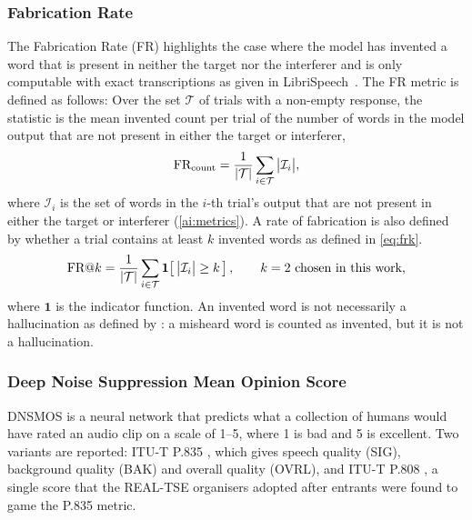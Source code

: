 \subsubsection{Fabrication Rate}
\label{sec:fr}
The Fabrication Rate (FR) highlights the case where the model has invented a word that is present in neither the target nor the interferer and is only computable with exact transcriptions as given in LibriSpeech~\cite{panayotov2015librispeech}. The FR metric is defined as follows:
Over the set $\mathcal{T}$ of trials with a non-empty response, the statistic is the mean invented count per trial of the number of words in the model output that are not present in either the target or interferer, 
\begin{equation}
    \textup{FR}_{\textup{count}} = \frac{1}{|\mathcal{T}|} \sum_{i \in \mathcal{T}} \big| \mathcal{I}_i \big|,
    \label{eq:frcount}
\end{equation}
where $\mathcal{I}_i$ is the set of words in the $i$-th trial's output that are not present in either the target or interferer (\ref{ai:metrics}). A rate of fabrication is also defined by whether a trial contains at least $k$ invented words as defined in \eqref{eq:frk}.  
\begin{equation}
    \textup{FR}@k = \frac{1}{|\mathcal{T}|} \sum_{i \in \mathcal{T}} \mathbf{1}\! \left[\, \big| \mathcal{I}_i \big| \ge k \,\right],
    \qquad k = 2 \text{ chosen in this work,}
    \label{eq:frk}
\end{equation}
where $\mathbf{1}\!$ is the indicator function. An invented word is not necessarily a hallucination as defined by \cite{koenecke2024careless}: a misheard word is counted as invented, but it is not a hallucination. 

\subsubsection{Deep Noise Suppression Mean Opinion Score}
\label{sec:dnsmos}
DNSMOS \cite{reddy2021dnsmos,reddy2022dnsmos835} is a neural network that predicts what a collection of humans would have rated an audio clip on a scale of 1--5, where 1 is bad and 5 is excellent. Two variants are reported: ITU-T P.835 \cite{itu2003p835}, which gives speech quality (SIG), background quality (BAK) and overall quality (OVRL), and ITU-T P.808 \cite{itu2018p808}, a single score that the REAL-TSE organisers adopted after entrants were found to game the P.835 metric. 

